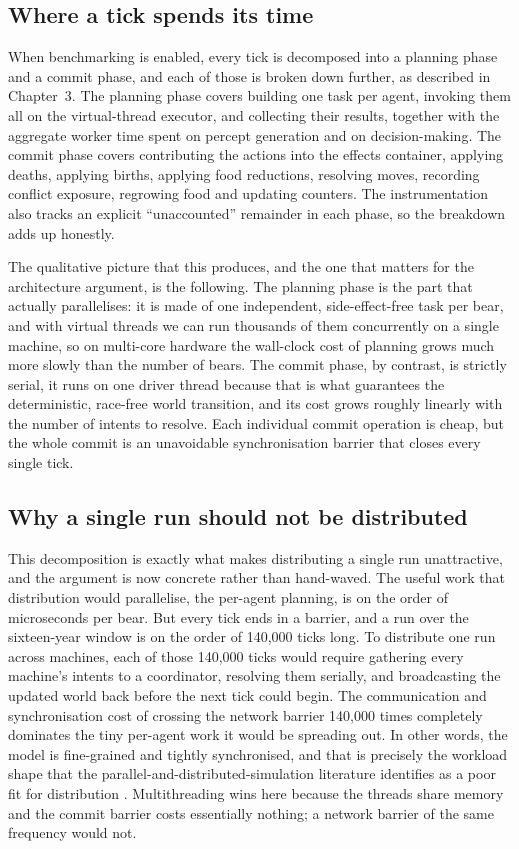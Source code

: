 \subsection{Where a tick spends its time}

When benchmarking is enabled, every tick is decomposed into a planning phase and a commit phase, and each of those is broken down further, as described in Chapter~3. The planning phase covers building one task per agent, invoking them all on the virtual-thread executor, and collecting their results, together with the aggregate worker time spent on percept generation and on decision-making. The commit phase covers contributing the actions into the effects container, applying deaths, applying births, applying food reductions, resolving moves, recording conflict exposure, regrowing food and updating counters. The instrumentation also tracks an explicit ``unaccounted'' remainder in each phase, so the breakdown adds up honestly.

The qualitative picture that this produces, and the one that matters for the architecture argument, is the following. The planning phase is the part that actually parallelises: it is made of one independent, side-effect-free task per bear, and with virtual threads we can run thousands of them concurrently on a single machine, so on multi-core hardware the wall-clock cost of planning grows much more slowly than the number of bears. The commit phase, by contrast, is strictly serial, it runs on one driver thread because that is what guarantees the deterministic, race-free world transition, and its cost grows roughly linearly with the number of intents to resolve. Each individual commit operation is cheap, but the whole commit is an unavoidable synchronisation barrier that closes every single tick.

\subsection{Why a single run should not be distributed}

This decomposition is exactly what makes distributing a single run unattractive, and the argument is now concrete rather than hand-waved. The useful work that distribution would parallelise, the per-agent planning, is on the order of microseconds per bear. But every tick ends in a barrier, and a run over the sixteen-year window is on the order of 140{,}000 ticks long. To distribute one run across machines, each of those 140{,}000 ticks would require gathering every machine's intents to a coordinator, resolving them serially, and broadcasting the updated world back before the next tick could begin. The communication and synchronisation cost of crossing the network barrier 140{,}000 times completely dominates the tiny per-agent work it would be spreading out. In other words, the model is fine-grained and tightly synchronised, and that is precisely the workload shape that the parallel-and-distributed-simulation literature identifies as a poor fit for distribution \cite{Fujimoto2000}. Multithreading wins here because the threads share memory and the commit barrier costs essentially nothing; a network barrier of the same frequency would not.

